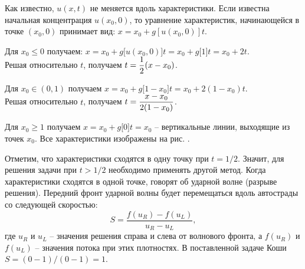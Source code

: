 Как известно, \( u(x, t) \) не меняется вдоль характеристики. Если известна
начальная концентрация \( u(x_0, 0) \), то уравнение характеристик, начинающейся
в точке \( (x_0, 0) \) принимает вид: \( x = x_0 + g[u(x_0, 0)]t \).

Для \( x_0 \le 0 \) получаем:
\( x = x_0 + g\bigl[u(x_0, 0)\bigr]t = x_0 + g\bigl[1\bigr]t = x_0 + 2t \).\\
Решая относительно \( t \), получаем \( \displaystyle t = \frac{1}{2}(x - x_0) \).

Для \( x_0 \in (0, 1) \) получаем
\( x = x_0 + g\bigl[1-x_0\bigr]t = x_0 + 2(1-x_0)t \).\\
Решая относительно \( t \), получаем \( \displaystyle t = \frac{x-x_0}{2(1 - x_0)} \).

Для \( x_0 \ge 1 \) получаем \( x = x_0 + g\bigl[0\bigr]t = x_0 \) --
вертикальные линии, выходящие из точек \( x_0 \). Все характеристики изображены
на рис. \smiley.

Отметим, что характеристики сходятся в одну точку при \( t = 1/2 \). Значит, для
решения задачи при \( t > 1/2 \) необходимо применять другой метод. Когда
характеристики сходятся в одной точке, говорят об ударной волне (разрыве
решения). Передний фронт ударной волны будет перемещаться вдоль автострады со
следующей скоростью:
\[
    S = \frac{f(u_R) - f(u_L)}{u_R - u_L},
\]
где \( u_R \) и \( u_L \) -- значения решения справа и слева от волнового
фронта, а \( f(u_R) \) и \( f(u_L) \) -- значения потока при этих плотностях. В
поставленной задаче Коши \( S = (0 - 1)/(0 - 1) = 1 \).

\newpage
